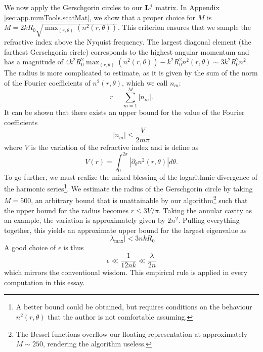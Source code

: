 We now apply the Gerschgorin circles to our $\mathbf{L}^j$ matrix. 
In Appendix \ref{sec:app.numTools.scatMat}, we show that a proper choice for $M$
is $M=2kR_0\sqrt{\mathop{\max}_{(r,\theta)}\left(n^2(r,\theta)\right)}$. This criterion
ensures that we sample the refractive index above the Nyquist frequency. The largest
diagonal element (the farthest Gerschgorin circle) corresponds
to the highest angular momentum and has a magnitude of 
$4k^2R_0^2\mathop{\max}_{(r,\theta)}\left(n^2(r,\theta)\right)-k^2R_0^2n^2(r,\theta)\sim3k^2R_0^2n^2$.
The radius is more complicated to estimate, as it is given by the sum of the norm
of the Fourier coefficients of $n^2(r,\theta)$, which we call $n_m$:
  \begin{equation}
   r = \sum_{m=1}^M |n_m|.
  \end{equation}
It can be shown that there exists an upper bound for the value of the
Fourier coefficients \cite{JAC1920}
  \begin{equation}
   |n_m| \leq \frac{V}{2m\pi}
  \end{equation}
where $V$ is the variation of the refractive index and is define as
  \begin{equation}
   V(r) = \int_0^{2\pi}\left|\partial_\theta n^2(r,\theta)\right|d\theta.
  \end{equation}
To go further, we must realize the mixed blessing of the logarithmic
divergence of the harmonic series\footnote{A better bound could be obtained, but requires conditions
on the behaviour $n^2(r,\theta)$ that the author is not comfortable assuming.}. We estimate the radius
of the Gerschgorin circle by taking $M=500$, an arbitrary bound
that is unattainable by our algorithm\footnote{The Bessel functions overflow our floating representation at approximately $M\sim250$,
rendering the algorithm useless.}
such that the upper bound for the radius becomes $r\leq 3V/\pi$. Taking the annular
cavity as an example, the variation is approximately given by 
$2n^2$. Pulling everything together, this yields an approximate upper
bound for the largest eigenvalue as
  \begin{equation}
   |\lambda_\text{max}| < 3nkR_0
  \end{equation}
A good choice of $\epsilon$ is thus
  \begin{equation}
   \epsilon \ll \frac{1}{12nk} \ll \frac{\lambda}{2n}
  \end{equation}
which mirrors the conventional wisdom. This empirical rule
is applied in every computation in this essay.

